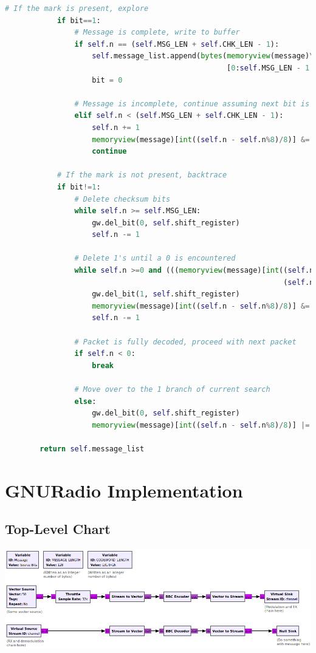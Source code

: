 \documentclass[conference]{IEEEtran}
\begin{document}
{\begin{lstlisting}[language=Python]
            # If the mark is present, explore
            if bit==1:
                # Message is complete, write to buffer
                if self.n == (self.MSG_LEN + self.CHK_LEN - 1):
                    self.message_list.append(bytes(memoryview(message)\
                                                   [0:self.MSG_LEN - 1 - self.CHK_LEN]))
                    bit = 0
                    
                # Message is incomplete, continue assuming next bit is 0
                elif self.n < (self.MSG_LEN + self.CHK_LEN - 1):
                    self.n += 1
                    memoryview(message)[int((self.n - self.n%8)/8)] &= (0xff ^ (1<<self.n%8))
                    continue
                    
            # If the mark is not present, backtrace
            if bit!=1:
                # Delete checksum bits
                while self.n >= self.MSG_LEN: 
                    gw.del_bit(0, self.shift_register)
                    self.n -= 1
                    
                # Delete 1's until a 0 is encountered
                while self.n >=0 and (((memoryview(message)[int((self.n - self.n%8)/8)]>>\
                                                                (self.n%8)) & 0b1 )==1):
                    gw.del_bit(1, self.shift_register)
                    memoryview(message)[int((self.n - self.n%8)/8)] &= (0xff ^ (1<<self.n%8))
                    self.n -= 1
                    
                # Packet is fully decoded, proceed with next packet
                if self.n < 0: 
                    break
                    
                # Move over to the 1 branch of current search
                else: 
                    gw.del_bit(0, self.shift_register)
                    memoryview(message)[int((self.n - self.n%8)/8)] |= (1<<self.n%8)

        return self.message_list
\end{lstlisting} 

\newpage
\section{GNURadio Implementation}
\subsection{Top-Level Chart}
\label{GnuTopLevel}
    \includegraphics[scale=.6]{images/BBC grc.png}

}
\end{document}
